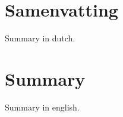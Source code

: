 \chapter*{Samenvatting}
Summary in dutch.

\cleardoublepage
{}
\chapter*{Summary}
Summary in english.
